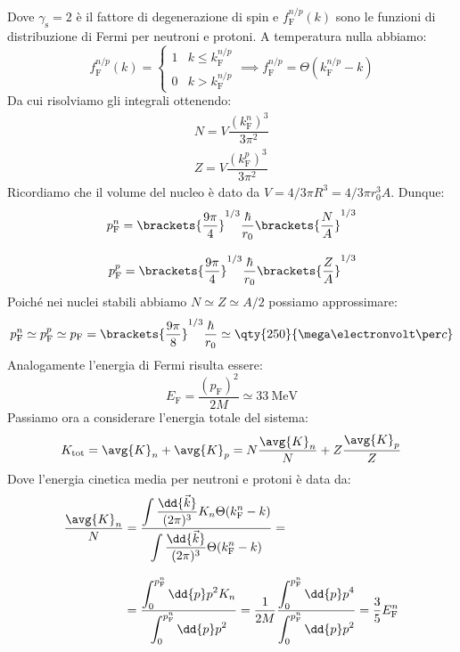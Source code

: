 Dove $\gamma_{\text{s}} = 2$ è il fattore di degenerazione di spin e $f_{\text{F}}^{n/p}(k)$ sono le funzioni di distribuzione di Fermi per neutroni e protoni. A temperatura nulla abbiamo:
\begin{equation}
 f_{\text{F}}^{n/p}(k) =
 \begin{cases}
  1 & k \leq k_{\text{F}}^{n/p} \\[6pt]
  0 & k > k_{\text{F}}^{n/p}
 \end{cases} \implies f_{\text{F}}^{n/p} = \Theta(k_{\text{F}}^{n/p} - k)
\end{equation}
Da cui risolviamo gli integrali ottenendo:
\begin{equation}
    \begin{split}
        N = V \dfrac{(k_{\text{F}}^n)^3}{3 \pi^2} \\[8pt]
        Z = V \dfrac{(k_{\text{F}}^p)^3}{3 \pi^2}
    \end{split}
\end{equation}
Ricordiamo che il volume del nucleo è dato da $V = 4/3 \pi R^3 = 4/3 \pi r_0^3 A$. Dunque:
\begin{equation}
    \begin{split}
        p_{\text{F}}^n = \brackets{ \dfrac{9 \pi}{4} }^{1/3} \dfrac{\hbar}{r_0} \brackets{\dfrac{N}{A}}^{1/3} \\[8pt]
        p_{\text{F}}^p = \brackets{ \dfrac{9 \pi}{4} }^{1/3} \dfrac{\hbar}{r_0} \brackets{\dfrac{Z}{A}}^{1/3}
    \end{split}
\end{equation}
Poiché nei nuclei stabili abbiamo $N \simeq Z \simeq A/2$ possiamo approssimare:
\begin{equation}
    p_{\text{F}}^n \simeq p_{\text{F}}^p \simeq p_{\text{F}} = \brackets{ \dfrac{9 \pi }{8} }^{1/3} \dfrac{\hbar}{r_0} \simeq \qty{250}{\mega\electronvolt\per c}
\end{equation}
Analogamente l'energia di Fermi risulta essere:
\begin{equation}
    E_{\text{F}} = \dfrac{(p_{\text{F}})^2}{2M} \simeq \qty{33}{\mega\electronvolt}
\end{equation}
Passiamo ora a considerare l'energia totale del sistema:
\begin{equation}
    K_{\text{tot}} = \avg{K}_n + \avg{K}_p = N \dfrac{\avg{K}_n}{N} + Z \dfrac{\avg{K}_p}{Z}
\end{equation}
Dove l'energia cinetica media per neutroni e protoni è data da:
\begin{equation}
    \begin{split}
        \dfrac{\avg{K}_{n}}{N} &= \dfrac{\displaystyle\int \dfrac{\dd{\vec{k}}}{(2\pi)^3} K_n \Theta (k_{\text{F}}^n - k)}{\displaystyle\int \dfrac{\dd{\vec{k}}}{(2\pi)^3} \Theta (k_{\text{F}}^n - k)} = \\[8pt]
        &= \dfrac{\displaystyle\int_0^{p_{\text{F}}^n} \dd{p} p^2 K_n }{\displaystyle\int_0^{p_{\text{F}}^n} \dd{p} p^2} = \dfrac{1}{2M}\dfrac{\displaystyle\int_0^{p_{\text{F}}^n} \dd{p} p^4 }{\displaystyle\int_0^{p_{\text{F}}^n} \dd{p} p^2} = \dfrac{3}{5} E_{\text{F}}^n \\[8pt]
    \end{split}
\end{equation}
